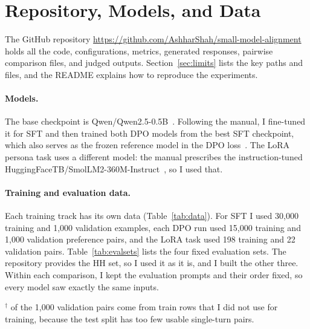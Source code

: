 \section{Repository, Models, and Data}
\label{sec:data}

The GitHub repository \url{https://github.com/AshharShah/small-model-alignment} holds all the code, configurations, metrics, generated responses, pairwise comparison files, and judged outputs. Section~\ref{sec:limits} lists the key paths and files, and the README explains how to reproduce the experiments.

\paragraph{Models.} The base checkpoint is Qwen/Qwen2.5-0.5B~\citep{qwen2025}. Following the manual, I fine-tuned it for SFT and then trained both DPO models from the best SFT checkpoint, which also serves as the frozen reference model in the DPO loss~\citep{rafailov2023dpo}. The LoRA persona task uses a different model: the manual prescribes the instruction-tuned HuggingFaceTB/\allowbreak SmolLM2-360M-Instruct~\citep{allal2025smollm2}, so I used that.

\paragraph{Training and evaluation data.} Each training track has its own data (Table~\ref{tab:data}). For SFT I used 30,000 training and 1,000 validation examples, each DPO run used 15,000 training and 1,000 validation preference pairs, and the LoRA task used 198 training and 22 validation pairs. Table~\ref{tab:evalsets} lists the four fixed evaluation sets. The repository provides the HH set, so I used it as it is, and I built the other three. Within each comparison, I kept the evaluation prompts and their order fixed, so every model saw exactly the same inputs.

\begin{table}[H]
\centering
\caption{Training data per track. I shuffled every dataset with seed 42 before filtering.}
\label{tab:data}

\par\vspace{3pt}\noindent\begin{minipage}{\textwidth}\footnotesize\raggedright $^\dagger$  of the 1,000 validation pairs come from train rows that I did not use for training, because the test split has too few usable single-turn pairs.\end{minipage}
\end{table}

